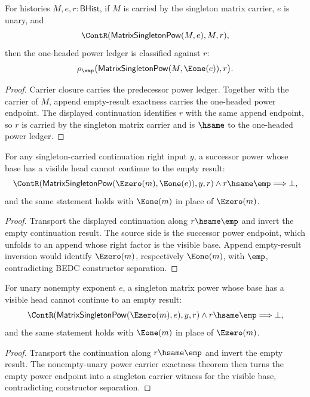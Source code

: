 \begin{theorem}
\label{thm:matrix-singleton-pow-succ-continuation-classifier}
For histories $M,e,r:\mathsf{BHist}$, if $M$ is carried by the singleton matrix
carrier, $e$ is unary, and
$$
\ContR(\mathsf{MatrixSingletonPow}(M,e),M,r),
$$
then the one-headed power ledger is classified against $r$:
$$
\rho_{\emp}\bigl(\mathsf{MatrixSingletonPow}(M,\Eone(e)),r\bigr).
$$
\end{theorem}
\begin{proof}
Carrier closure carries the predecessor power ledger. Together with the carrier
of $M$, append empty-result exactness carries the one-headed power endpoint.
The displayed continuation identifies $r$ with the same append endpoint, so
$r$ is carried by the singleton matrix carrier and is $\hsame$ to the
one-headed power ledger.
\end{proof}

\begin{theorem}
\label{thm:matrix-singleton-pow-visible-base-succ-continuation-empty-result-absurd}
For any singleton-carried continuation right input $y$, a successor power whose
base has a visible head cannot continue to the empty result:
$$
\ContR(\mathsf{MatrixSingletonPow}(\Ezero(m),\Eone(e)),y,r)
\land r\hsame\emp\Longrightarrow\bot,
$$
and the same statement holds with $\Eone(m)$ in place of $\Ezero(m)$.
\end{theorem}
\begin{proof}
Transport the displayed continuation along $r\hsame\emp$ and invert the empty
continuation result. The source side is the successor power endpoint, which
unfolds to an append whose right factor is the visible base. Append
empty-result inversion would identify $\Ezero(m)$, respectively $\Eone(m)$,
with $\emp$, contradicting BEDC constructor separation.
\end{proof}

\begin{theorem}
\label{thm:matrix-singleton-pow-positive-exponent-visible-base-continuation-empty-result-absurd}
For unary nonempty exponent $e$, a singleton matrix power whose base has a
visible head cannot continue to an empty result:
$$
\ContR(\mathsf{MatrixSingletonPow}(\Ezero(m),e),y,r)
\land r\hsame\emp\Longrightarrow\bot,
$$
and the same statement holds with $\Eone(m)$ in place of $\Ezero(m)$.
\end{theorem}
\begin{proof}
Transport the continuation along $r\hsame\emp$ and invert the empty result.
The nonempty-unary power carrier exactness theorem then turns the empty power
endpoint into a singleton carrier witness for the visible base, contradicting
constructor separation.
\end{proof}

